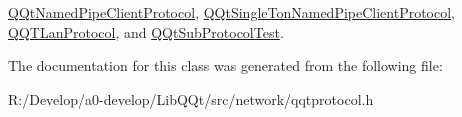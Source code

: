\mbox{\hyperlink{class_q_qt_named_pipe_client_protocol_a909aa772837f6ee556d59fb7fbdb3f37}{Q\+Qt\+Named\+Pipe\+Client\+Protocol}}, \mbox{\hyperlink{class_q_qt_single_ton_named_pipe_client_protocol_a55378f2a22af0d424022c8d2383d88f5}{Q\+Qt\+Single\+Ton\+Named\+Pipe\+Client\+Protocol}}, \mbox{\hyperlink{class_q_q_t_lan_protocol_ad7cfd8f888490a3453f7868cc38d914b}{Q\+Q\+T\+Lan\+Protocol}}, and \mbox{\hyperlink{class_q_qt_sub_protocol_test_aaf24e5745a46de9a5d6dd4ba06a5603c}{Q\+Qt\+Sub\+Protocol\+Test}}.



The documentation for this class was generated from the following file\+:\begin{DoxyCompactItemize}
\item 
R\+:/\+Develop/a0-\/develop/\+Lib\+Q\+Qt/src/network/qqtprotocol.\+h\end{DoxyCompactItemize}
